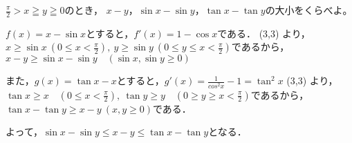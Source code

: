 \begin{problem}
$\displaystyle\frac{\pi}{2}>x \geqq y \geqq 0$のとき，
$x-y$，$\sin x-\sin y$，$\tan x-\tan y$の大小をくらべよ。
\end{problem}

$f(x) = x - \sin x$とすると，$f'(x) = 1-\cos x$である．
\RESETKEYA
{}
\zogen(3,3)
より，$x \geq \sin x \ (0\leq x < \frac\pi2),\ y \geq \sin y\ (0 \leq y \leq x < \frac\pi2)$であるから，\\
$x-y \geq \sin x -\sin y\quad (\sin x, \sin y \geq 0)$

また，$g(x) = \tan x - x$とすると，$g'(x) = \frac1{cos^2x} - 1 = \tan^2x$
\RESETKEYA
{}
\zogen(3,3)
より，$\tan x \geq x \quad(0 \leq x < \frac{\pi}{2}),\ \tan y \geq y\quad (0 \geq y \geq x < \frac{\pi}{2})$であるから，$\tan x - \tan y \geq x-y \ (x,y \geq 0)$である．

よって，$\sin x - \sin y \leq x-y \leq \tan x - \tan y$となる．
